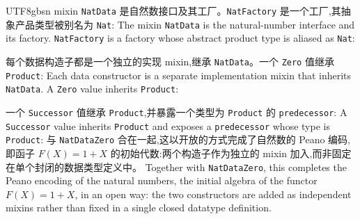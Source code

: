 \begin{CJK*}{UTF8}{gbsn}
\ifPaperChinese
  mixin \texttt{NatData} 是自然数接口及其工厂。\texttt{NatFactory} 是一个工厂,其抽象产品类型被别名为 \texttt{Nat}:
  \else
  The mixin \texttt{NatData} is the natural-number interface and its factory.
  \texttt{NatFactory} is a factory whose abstract product type is aliased as \texttt{Nat}:
  \fi
{}

\ifPaperChinese
  每个数据构造子都是一个独立的实现 mixin,继承 \texttt{NatData}。一个 \texttt{Zero} 值继承 \texttt{Product}:
  \else
  Each data constructor is a separate implementation mixin that inherits
  \texttt{NatData}.
  A \texttt{Zero} value inherits \texttt{Product}:
  \fi
{}

\ifPaperChinese
  一个 \texttt{Successor} 值继承 \texttt{Product},并暴露一个类型为 \texttt{Product} 的 \texttt{predecessor}:
  \else
  A \texttt{Successor} value inherits \texttt{Product} and
  exposes a \texttt{predecessor} whose type is \texttt{Product}:
  \fi
{}
\ifPaperChinese
与 \texttt{NatDataZero} 合在一起,这以开放的方式完成了自然数的 Peano 编码,即函子 $F(X) = 1 + X$ 的初始代数:两个构造子作为独立的 mixin 加入,而非固定在单个封闭的数据类型定义中。
\else
Together with \texttt{NatDataZero}, this completes the Peano encoding of
the natural numbers, the initial algebra of the functor $F(X) = 1 + X$,
in an open way: the two constructors are added as independent mixins
rather than fixed in a single closed datatype definition.
\fi


\end{CJK*}
